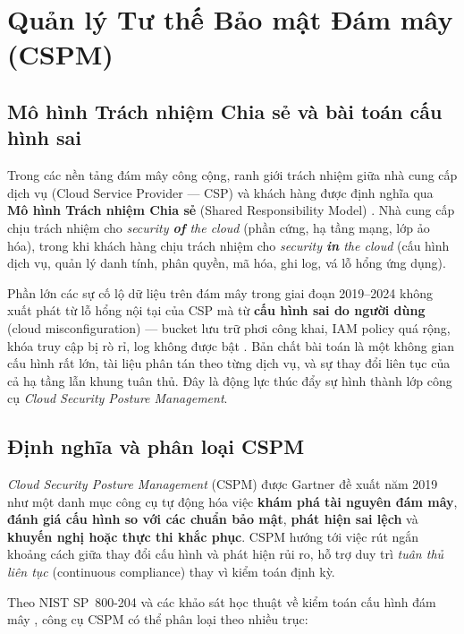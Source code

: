 \section{Quản lý Tư thế Bảo mật Đám mây (CSPM)}
\label{sec:cspm}

\subsection{Mô hình Trách nhiệm Chia sẻ và bài toán cấu hình sai}
\label{subsec:shared-responsibility}

Trong các nền tảng đám mây công cộng, ranh giới trách nhiệm giữa nhà cung cấp dịch vụ (Cloud Service Provider --- CSP) và khách hàng được định nghĩa qua \textbf{Mô hình Trách nhiệm Chia sẻ} (Shared Responsibility Model) \cite{aws_shared_responsibility}. Nhà cung cấp chịu trách nhiệm cho \textit{security \textbf{of} the cloud} (phần cứng, hạ tầng mạng, lớp ảo hóa), trong khi khách hàng chịu trách nhiệm cho \textit{security \textbf{in} the cloud} (cấu hình dịch vụ, quản lý danh tính, phân quyền, mã hóa, ghi log, vá lỗ hổng ứng dụng).

Phần lớn các sự cố lộ dữ liệu trên đám mây trong giai đoạn 2019--2024 không xuất phát từ lỗ hổng nội tại của CSP mà từ \textbf{cấu hình sai do người dùng} (cloud misconfiguration) --- bucket lưu trữ phơi công khai, IAM policy quá rộng, khóa truy cập bị rò rỉ, log không được bật \cite{verizon_dbir_2024,ibm_cost_breach_2024}. Bản chất bài toán là một không gian cấu hình rất lớn, tài liệu phân tán theo từng dịch vụ, và sự thay đổi liên tục của cả hạ tầng lẫn khung tuân thủ. Đây là động lực thúc đẩy sự hình thành lớp công cụ \textit{Cloud Security Posture Management}.

\subsection{Định nghĩa và phân loại CSPM}
\label{subsec:cspm-def}

\textit{Cloud Security Posture Management} (CSPM) được Gartner đề xuất năm 2019 \cite{gartner_cspm} như một danh mục công cụ tự động hóa việc \textbf{khám phá tài nguyên đám mây}, \textbf{đánh giá cấu hình so với các chuẩn bảo mật}, \textbf{phát hiện sai lệch} và \textbf{khuyến nghị hoặc thực thi khắc phục}. CSPM hướng tới việc rút ngắn khoảng cách giữa thay đổi cấu hình và phát hiện rủi ro, hỗ trợ duy trì \textit{tuân thủ liên tục} (continuous compliance) thay vì kiểm toán định kỳ.

Theo NIST SP~800-204 \cite{nist_sp_800_204} và các khảo sát học thuật về kiểm toán cấu hình đám mây \cite{cloud_audit_survey_2023}, công cụ CSPM có thể phân loại theo nhiều trục:

